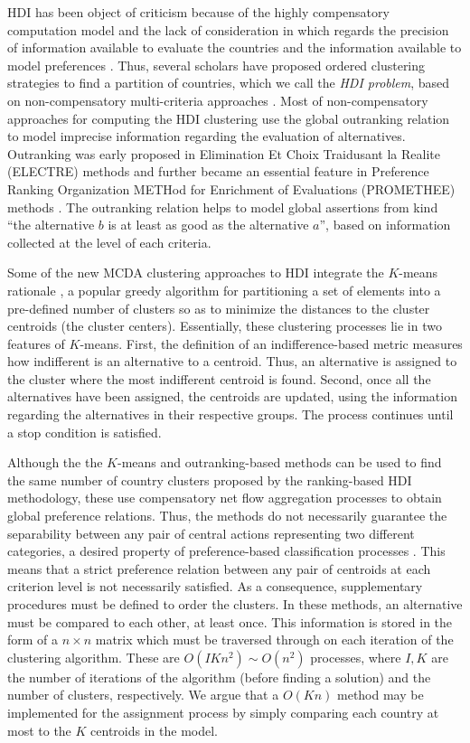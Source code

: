 \documentclass[]{elsarticle}
\theoremstyle{definition}
\begin{document}
HDI has been object of criticism because of the highly compensatory computation model and the lack of consideration in which regards the precision of information available to evaluate the countries and the information available to model preferences \citep{Noorbakhsh1998, Berenger2007, Klugman2011, Martinez2013}.  Thus, several scholars have proposed  ordered clustering strategies to find a partition of countries, which we call the \emph{HDI problem}, based on non-compensatory multi-criteria approaches \citep{DeSmet2014,Boujelben2016}.  Most of non-compensatory approaches for computing the HDI clustering use the global outranking relation to model imprecise information regarding the evaluation of alternatives. Outranking was early proposed in Elimination Et Choix Traidusant la Realite (ELECTRE) methods \citep{figueira2010} and further became an essential feature in  Preference Ranking Organization METHod for Enrichment of Evaluations (PROMETHEE) methods \cite{brans85}. The outranking relation helps to model global  assertions from kind ``the alternative $b$ is at least as good as the alternative $a$'', based on information collected at the level of each criteria. 

Some of the new MCDA clustering approaches to HDI integrate the $K$-means rationale \citep{DeSmet2009,Lolli2014,Panapakidis2018, Chen2018}, a popular greedy algorithm for partitioning a set of elements into a pre-defined number of clusters so as to minimize the distances to the cluster centroids (the cluster centers). Essentially, these clustering processes lie in two features of $K$-means. First, the definition of  an indifference-based metric measures how indifferent is an alternative to a centroid. Thus, an alternative is assigned to the cluster where the most indifferent centroid is found. Second, once all the alternatives have been assigned, the centroids are updated, using the information regarding the alternatives in their respective groups.  The process continues until a stop condition is satisfied. 

Although the the $K$-means and outranking-based methods can be used to find the same number of country clusters proposed by the ranking-based HDI methodology, these use compensatory net flow aggregation processes to obtain global preference relations. Thus, the methods do not necessarily guarantee the separability between any pair of central actions representing two different categories, a desired property of preference-based classification processes \citep{roy2012}. This means that a strict preference relation between any pair of centroids at each criterion level is not necessarily satisfied. As a consequence, supplementary procedures must be defined to order the clusters.  In these methods,  an alternative must be compared to each other, at least once. This information is stored in the form of a $n \times n$ matrix which must be traversed through on each iteration of the clustering algorithm. These are $O(IKn^2) \sim O(n^2)$ processes, where $I, K$ are the number of iterations of the algorithm (before finding a solution) and the number of clusters, respectively. We argue that a $O(Kn)$ method may be implemented for the assignment process by simply comparing each country at most to the $K$ centroids in the model.  
\end{document}
